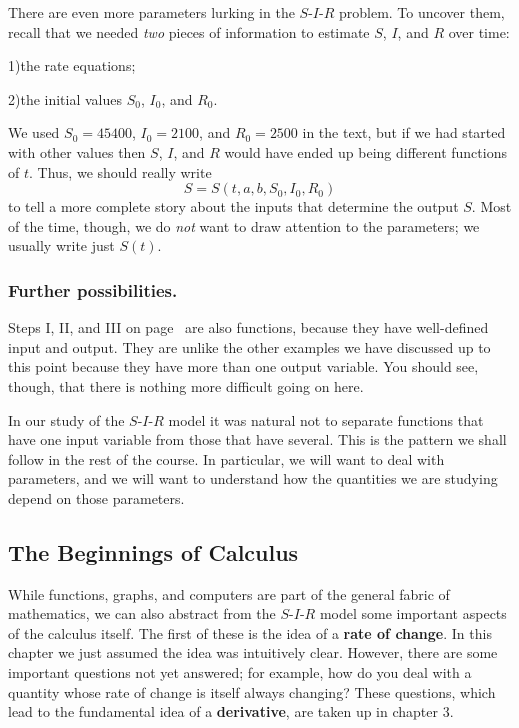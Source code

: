 There are even more parameters lurking in the $S$-$I$-$R$ problem.  To
uncover them, recall that we needed {\em two\/} pieces of information
to estimate $S$, $I$, and $R$ over time:


1)\quad the rate equations; 

2)\quad the initial values $S_0$, $I_0$, and $R_0$.



We used $S_0 = 45400$, $I_0 = 2100$, and $R_0 = 2500$ in the text, but
if we had started with other values then $S$, $I$, and $R$ would have
ended up being different functions of $t$.  Thus, we should really
write
\[
S = S(t, a, b, S_0, I_0, R_0)
\]
to tell a more complete story about the inputs that determine the
output $S$.  Most of the time, though, we do {\em not\/} want to draw
attention to the parameters; we usually write just $S(t)$.




\subsubsection{Further possibilities.}
Steps I, II, and III on
page~\pageref{`flowchart'} are also functions, because they have
well-defined input and output.  They are unlike the other examples we
have discussed up to this point because they have more than one output
variable.  You should see, though, that there is nothing more
difficult going on here.

In our study of the $S$-$I$-$R$ model it was natural not to separate
functions that have one input variable from those that have several.
This is the pattern we shall follow in the rest of the course.  In
particular, we will want to deal with parameters, and we will want to
understand how the quantities we are studying depend on those
parameters.


\subsection{The Beginnings of Calculus}
\label{subsec:the-beginnings-of-calculus}

While functions, graphs, and computers are part of the general fabric
of mathematics, we can also abstract from the $S$-$I$-$R$ model some
important aspects of the calculus itself.  The first of these is the
idea of a {\bf rate of change}. In this chapter
we just assumed the idea was intuitively clear.  However, there are
some important questions not yet answered; for example, how do you
deal with a quantity whose rate of change is itself always changing?
These questions, which lead to the fundamental idea of a {\bf
  derivative}, are taken up in chapter 3.

